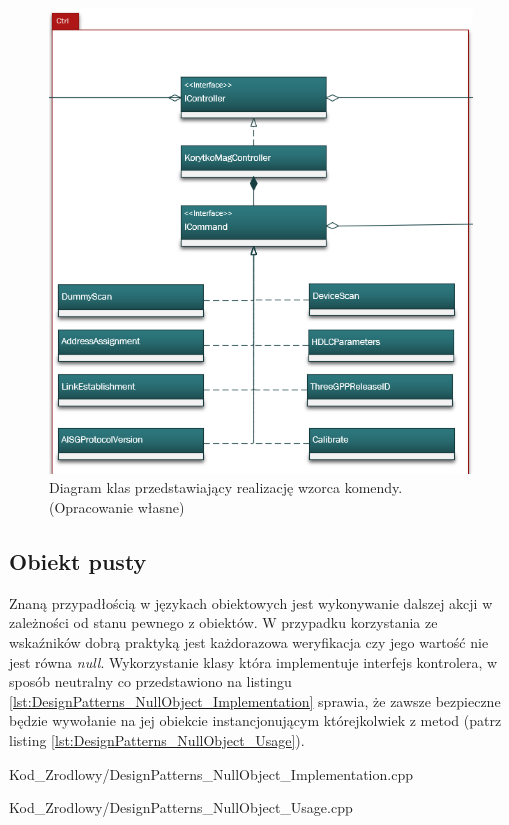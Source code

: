         \begin{figure}[h!]
            \centering
            \includegraphics[scale=0.90]{Obrazki/DiagramyKlas/Ctrl.png}
            \caption{Diagram klas przedstawiający realizację wzorca komendy.
                \newline(Opracowanie własne)}
            \label{fig:DiagramKlas_CTRL}
        \end{figure}
    \newpage
    \subsection{Obiekt pusty}
        Znaną przypadłością w językach obiektowych jest wykonywanie dalszej akcji w zależności od stanu pewnego z obiektów.
        W przypadku korzystania ze wskaźników dobrą praktyką jest każdorazowa weryfikacja czy jego wartość nie jest równa \textit{null}.
        Wykorzystanie klasy która implementuje interfejs kontrolera, w sposób neutralny co przedstawiono na listingu \ref{lst:DesignPatterns_NullObject_Implementation}
        sprawia, że zawsze bezpieczne będzie wywołanie na jej obiekcie instancjonującym którejkolwiek z metod (patrz listing \ref{lst:DesignPatterns_NullObject_Usage}).
    \newpage
        
            {Kod_Zrodlowy/DesignPatterns_NullObject_Implementation.cpp}
        
            {Kod_Zrodlowy/DesignPatterns_NullObject_Usage.cpp}
    \newpage
